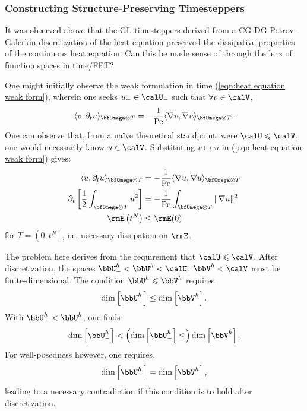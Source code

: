 \subsubsection{Constructing Structure-Preserving Timesteppers}
    It was observed above that the GL timesteppers derived from a CG-DG Petrov–Galerkin discretization of the heat equation preserved the dissipative properties of the continuous heat equation. Can this be made sense of through the lens of function spaces in time/FET?

    One might initially observe the weak formulation in time (\ref{eqn:heat equation weak form}), wherein one seeks $u_{-}  \in  \calU_{-}$ such that $\forall  v  \in  \calV$,
    \begin{equation*}
        \langle v, \partial_{t}u\rangle_{\bfOmega\otimes T}  =   - \frac{1}{\rmPe}\langle\nabla v, \nabla u\rangle_{\bfOmega\otimes T}.
    \end{equation*}
    One can observe that, from a naïve theoretical standpoint, were $\calU  \leqslant  \calV$, one would necessarily know $u  \in  \calV$. Substituting $v  \mapsto  u$ in (\ref{eqn:heat equation weak form}) gives:
    \begin{align}
        \langle u, \partial_{t}u\rangle_{\bfOmega\otimes T}  &=   - \frac{1}{\rmPe}\langle\nabla u, \nabla u\rangle_{\bfOmega\otimes T}  \label{eqn:heat equation dissipation proof 1}  \\
        \partial_{t}\left[\frac{1}{2}\int_{\bfOmega\otimes T}u^{2}\right]  &=   - \frac{1}{\rmPe}\int_{\bfOmega\otimes T}\|\nabla u\|^{2}  \\
        \rmE\left(t^{N}\right)  &\leq  \rmE(0)  \label{eqn:heat equation dissipation proof 3}
    \end{align}
    for $T  =  \left(0, t^{N}\right]$, i.e. necessary dissipation on $\rmE$.
    
    The problem here derives from the requirement that $\calU  \leqslant  \calV$. After discretization, the spaces $\bbU^{h}_{-}  <  \bbU^{h}  <  \calU$, $\bbV^{h}  <  \calV$ must be finite-dimensional. The condition $\bbU^{h}  \leqslant  \bbV^{h}$ requires
    \begin{equation}
        \dim\left[\bbU^{h}_{-}\right]  \leq  \dim\left[\bbV^{h}\right].
    \end{equation}
    With $\bbU^{h}_{-}  <  \bbU^{h}$, one finds
    \begin{equation}
        \dim\left[\bbU^{h}_{-}\right]  <  \left(\dim\left[\bbU^{h}_{-}\right]  \leq\right)  \dim\left[\bbV^{h}\right].
    \end{equation}
    For well-posedness however, one requires,
    \begin{equation}
        \dim\left[\bbU^{h}_{-}\right]  =  \dim\left[\bbV^{h}\right],
    \end{equation}
    leading to a necessary contradiction if this condition is to hold after discretization. \contra

